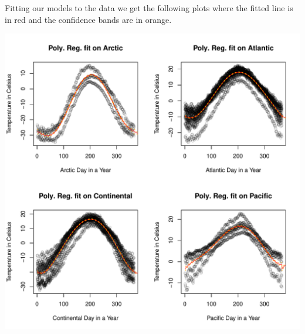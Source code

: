 \documentclass[aoas]{imsart}\usepackage[]{graphicx}\usepackage[]{xcolor}
\newenvironment{knitrout}{}{} %
\begin{document}
Fitting our models to the data we get the following plots where the fitted line is in red and the confidence bands are in orange.
\begin{knitrout}
\color{fgcolor}

{\centering \includegraphics[width=1.01\linewidth,height=0.52\textheight]{figure/unnamed-chunk-4-1} 

}


\end{knitrout}
\end{document}
